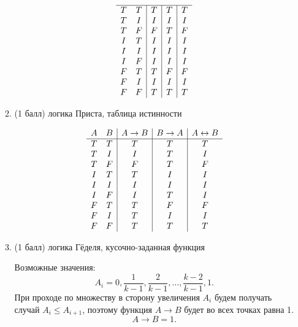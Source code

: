 \begin{enumerate}
\begin{enumerate}
\begin{solution}
\begin{displaymath}
\begin{array}{c c|c|c|c}
        \hline
        T & T & T & T & T\\
        T & I & I & I & I\\
        T & F & F & T & F\\
        I & T & I & I & I\\
        I & I & I & I & I\\
        I & F & I & I & I\\
        F & T & T & F & F\\
        F & I & I & I & I\\
        F & F & T & T & T
      \end{array}
      \end{displaymath}
    \end{solution}
    \item (1 балл) логика Приста, таблица истинности
    \begin{solution}
      \begin{displaymath}
      \begin{array}{c c|c|c|c}
        A & B & A \rightarrow B & B \rightarrow A & A \leftrightarrow B\\
        \hline
        T & T & T & T & T\\
        T & I & I & T & I\\
        T & F & F & T & F\\
        I & T & T & I & I\\
        I & I & I & I & I\\
        I & F & I & T & I\\
        F & T & T & F & F\\
        F & I & T & I & I\\
        F & F & T & T & T
      \end{array}
      \end{displaymath}
    \end{solution}
    \item (1 балл) логика Гёделя, кусочно-заданная функция
    \begin{solution}
      Возможные значения:
      \begin{equation}
        A_i = 0, \frac{1}{k-1}, \frac{2}{k-1}, \dots, \frac{k-2}{k-1}, 1.
      \end{equation}
      При проходе по множеству в сторону увеличения $A_i$ будем получать случай $A_i\leq A_{i+1}$, поэтому функция $A\rightarrow B$ будет во всех точках равна 1.
      \begin{equation}
        A\rightarrow B = 1.
      \end{equation}

\end{solution}
\end{enumerate}
\end{enumerate}
